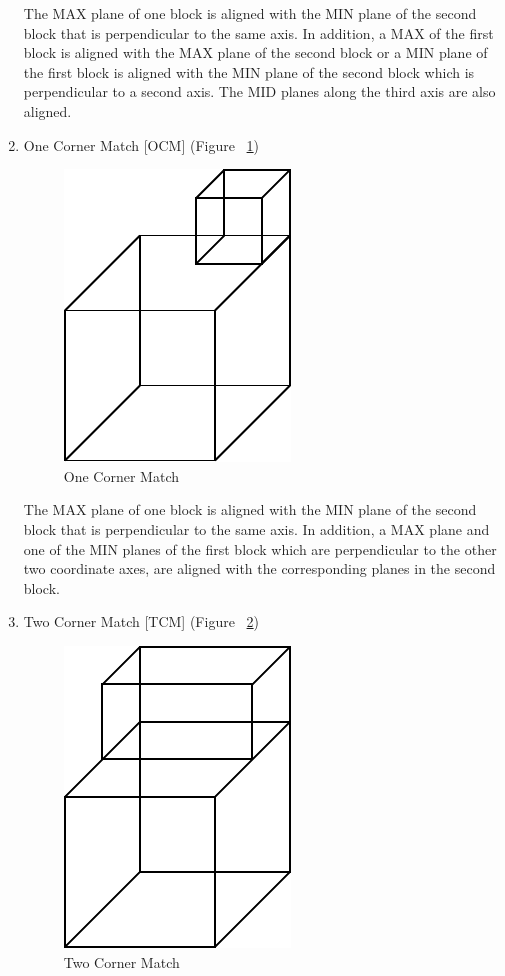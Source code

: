 \begin{enumerate}
		The MAX plane of one block is aligned with the MIN plane of the second 
		block that is perpendicular to the same axis. In addition, a MAX
		of the first block is aligned with the MAX plane of the second block
		or a MIN plane of the first block is aligned with the MIN plane of the
		second block which is perpendicular to a second axis. The MID planes
		along the third axis are also aligned.

	\item
	One Corner Match [OCM]	(Figure ~\ref{ocm})

        \begin{figure}[htbp]
	\hspace{4cm}
	\includegraphics{OCM.pdf}
	\caption{One Corner Match}
            \label{ocm}
        \end{figure}
 
		The MAX plane of one block is aligned with the MIN plane of the second 
        block that is perpendicular to the same axis. In addition, a MAX plane
		and one of the MIN planes of the first block which are perpendicular to
		the other two coordinate axes, are aligned with the corresponding planes
		in the second block.

	\item
	Two Corner Match [TCM]	(Figure ~\ref{tcm})

        \begin{figure}[htbp]
	\hspace{4cm}
	\includegraphics{TCM.pdf}
	\caption{Two Corner Match}
            \label{tcm}
        \end{figure}
 

\end{enumerate}
